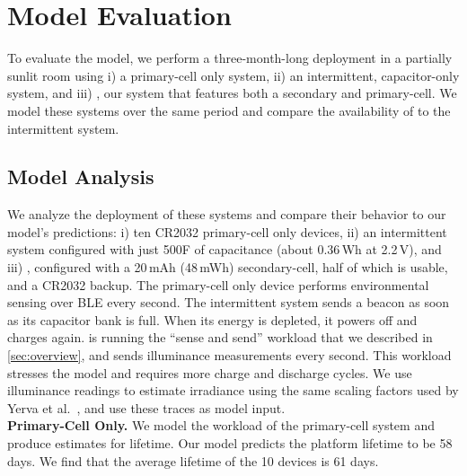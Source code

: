\section{Model Evaluation}
\label{sec:eval}
To evaluate the model, we perform a three-month-long deployment in a partially sunlit room
using i) a primary-cell only system, ii) an intermittent, capacitor-only system, and iii) \name, our
system that features both a secondary and primary-cell. We model these
systems over the same period and compare the availability of \name to the
intermittent system.

\subsection{Model Analysis}
\label{sec:eval:model}
We analyze the deployment of these systems
and compare their behavior to our
model's predictions: i) ten CR2032 primary-cell only devices, ii) an
intermittent system configured with just 500\textmu F of capacitance (about
0.36\,\textmu Wh at 2.2\,V), and iii) \name, configured with a 20\,mAh
(48\,mWh) secondary-cell, half of which is usable, and a CR2032 backup.  The
primary-cell only device performs environmental sensing over BLE every second.
The intermittent system  sends a beacon as soon as its capacitor bank is full.
When its energy is depleted, it powers off and charges
again. \name is running the ``sense and send'' workload that we described in
\cref{sec:overview}, and sends illuminance measurements every second. This
workload stresses the model and requires more charge and discharge cycles.  We
use \name illuminance readings to estimate irradiance using the same scaling factors used by
Yerva et al.~\cite{yervaGrafting12}, and use these traces as
model input.\\

\vspace{-6pt}
\noindent
\textbf{Primary-Cell Only.}
We model the workload of the primary-cell system and produce estimates for
lifetime.  Our model predicts the platform lifetime
to be 58 days.  We find that the average lifetime of the 10 devices is 61 days.
\\

